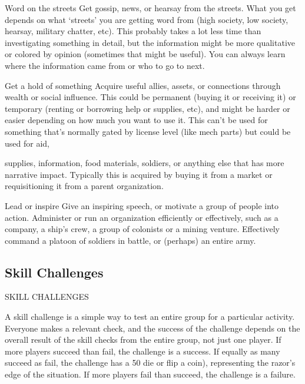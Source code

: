 Word on the streets
Get gossip, news, or hearsay from the streets. What you get depends on what ‘streets’ you are
getting word from (high society, low society, hearsay, military chatter, etc). This probably takes a
lot less time than investigating something in detail, but the information might be more qualitative
or colored by opinion (sometimes that might be useful). You can always learn where the
information came from or who to go to next.

Get a hold of something
Acquire useful allies, assets, or connections through wealth or social influence. This could be
permanent (buying it or receiving it) or temporary (renting or borrowing help or supplies, etc), and
might be harder or easier depending on how much you want to use it. This can’t be used for
something that’s normally gated by license level (like mech parts) but could be used for aid,




supplies, information, food materials, soldiers, or anything else that has more narrative impact.
Typically this is acquired by buying it from a market or requisitioning it from a parent organization.

Lead or inspire
Give an inspiring speech, or motivate a group of people into action. Administer or run an
organization efficiently or effectively, such as a company, a ship’s crew, a group of colonists or a
mining venture. Effectively command a platoon of soldiers in battle, or (perhaps) an entire army.

\subsection{Skill Challenges}
                                         SKILL CHALLENGES

A skill challenge is a simple way to test an entire group for a particular activity. Everyone makes a
relevant check, and the success of the challenge depends on the overall result of the skill checks
from the entire group, not just one player. If more players succeed than fail, the challenge is a
success. If equally as many succeed as fail, the challenge has a 50%
die or flip a coin), representing the razor’s edge of the situation. If more players fail than succeed,
the challenge is a failure.

